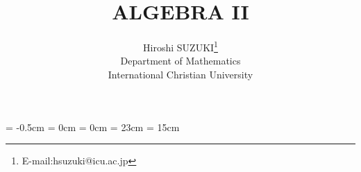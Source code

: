 

\topmargin = -0.5cm
\oddsidemargin = 0cm \evensidemargin = 0cm
\textheight = 23cm \textwidth = 15cm %

\title{ALGEBRA II}
      
\author{Hiroshi SUZUKI\thanks{E-mail:hsuzuki@icu.ac.jp}\\ 
        Department of Mathematics \\ 
        International Christian University}

\newtheorem{thm}{定理}[section]
\newtheorem{prop}[thm]{命題}
\newtheorem{lemma}[thm]{補題}
\newtheorem{cor}[thm]{系}
\newtheorem{exercise}{練習問題}[section]
\newtheorem{example}{例}[section]
\newtheorem{problem}{問題}[section]
\newtheorem{defin}{定義}[section]
\newenvironment{definition}{\begin{defin} \rm}{\end{defin}}
\newenvironment{ex}{\begin{exercise} \rm}{\end{exercise}}
\newenvironment{eg}{\begin{example} \rm}{\end{example}}
\newenvironment{prob}{\begin{problem} \rm}{\end{problem}}
\newcommand{\remarks}{\vspace{2ex}\noindent{\bf Remarks.\quad}}
\newcommand{\note}{\vspace{2ex}\noindent{\gt 注\quad}}
\newcommand{\proof}{{\gt 証明\quad}}
\newcommand{\pf}{({\it Pf.})\quad}
\newcommand{\qed}{\hfill\hbox{\rule{6pt}{6pt}}}
\newcommand{\bZ}{\mbox{\boldmath $Z$}}
\newcommand{\bN}{\mbox{\boldmath $N$}}
\newcommand{\bR}{\mbox{\boldmath $R$}}
\newcommand{\bC}{\mbox{\boldmath $C$}}
\newcommand{\bQ}{\mbox{\boldmath $Q$}}
\newcommand{\cQ}{{\cal Q}}
\newcommand{\mat}{\mbox{{\rm Mat}}}
\newcommand{\GL}{\mbox{{\rm GL}}}
\newcommand{\mod}{\mbox{{\rm mod} }}
\renewcommand{\ker}{\mbox{{\rm Ker}}}
\newcommand{\sker}{\mbox{{\scriptsize\rm Ker}}}
\newcommand{\im}{\mbox{{\rm Im}}}


